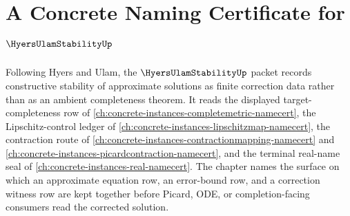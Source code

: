 \chapter{A Concrete Naming Certificate for $\HyersUlamStabilityUp$}
\label{ch:concrete-instances-hyers-ulam-stability-namecert}

Following Hyers and Ulam, the $\HyersUlamStabilityUp$ packet records constructive stability of approximate solutions as finite correction data rather than as an ambient completeness theorem. It reads the displayed target-completeness row of \autoref{ch:concrete-instances-completemetric-namecert}, the Lipschitz-control ledger of \autoref{ch:concrete-instances-lipschitzmap-namecert}, the contraction route of \autoref{ch:concrete-instances-contractionmapping-namecert} and \autoref{ch:concrete-instances-picardcontraction-namecert}, and the terminal real-name seal of \autoref{ch:concrete-instances-real-namecert}. The chapter names the surface on which an approximate equation row, an error-bound row, and a correction witness row are kept together before Picard, ODE, or completion-facing consumers read the corrected solution.

